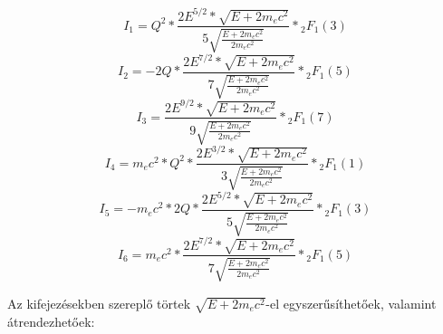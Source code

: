 \begin{multicols}{2}
\begin{equation} \label{eq:49}
I_{1}
=
Q^{2}
*
\frac{2 E^{5/2} * \sqrt{E + 2m_{e}c^{2}}}{5 \sqrt{\frac{E + 2m_{e}c^{2}}{2m_{e}c^{2}}}} * {}_2F_{1} \left( 3 \right)
\end{equation}
\begin{equation} \label{eq:50}
I_{2}
=
- 2Q
*
\frac{2 E^{7/2} * \sqrt{E + 2m_{e}c^{2}}}{7 \sqrt{\frac{E + 2m_{e}c^{2}}{2m_{e}c^{2}}}} * {}_2F_{1} \left( 5 \right)
\end{equation}
\begin{equation} \label{eq:51}
I_{3}
=
\frac{2 E^{9/2} * \sqrt{E + 2m_{e}c^{2}}}{9 \sqrt{\frac{E + 2m_{e}c^{2}}{2m_{e}c^{2}}}} * {}_2F_{1} \left( 7 \right)
\end{equation}
\begin{equation} \label{eq:52}
I_{4}
=
m_{e}c^{2} * Q^{2}
*
\frac{2 E^{3/2} * \sqrt{E + 2m_{e}c^{2}}}{3 \sqrt{\frac{E + 2m_{e}c^{2}}{2m_{e}c^{2}}}} * {}_2F_{1} \left( 1 \right)
\end{equation}
\begin{equation} \label{eq:53}
I_{5}
=
- m_{e}c^{2} * 2Q
*
\frac{2 E^{5/2} * \sqrt{E + 2m_{e}c^{2}}}{5 \sqrt{\frac{E + 2m_{e}c^{2}}{2m_{e}c^{2}}}} * {}_2F_{1} \left( 3 \right)
\end{equation}
\begin{equation} \label{eq:54}
I_{6}
=
m_{e}c^{2}
*
\frac{2 E^{7/2} * \sqrt{E + 2m_{e}c^{2}}}{7 \sqrt{\frac{E + 2m_{e}c^{2}}{2m_{e}c^{2}}}} * {}_2F_{1} \left( 5 \right)
\end{equation}
\end{multicols}
Az kifejezésekben szereplő törtek $\sqrt{E + 2m_{e}c^{2}}$-el egyszerűsíthetőek, valamint átrendezhetőek:

